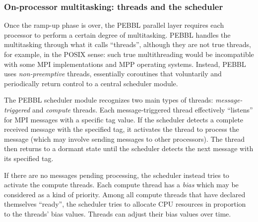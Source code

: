 \subsubsection{On-processor multitasking: threads and the scheduler}

Once the ramp-up phase is over, the PEBBL parallel layer requires each
processor to perform a certain degree of multitasking.  PEBBL handles
the multitasking through what it calls ``threads'', although they are
not true threads, for example, in the POSIX sense: such true
multithreading would be incompatible with some MPI implementations and
MPP operating systems.  Instead, PEBBL uses \emph{non-preemptive}
threads, essentially coroutines that voluntarily and periodically
return control to a central scheduler module.

The PEBBL scheduler module recognizes two main types of threads:
\emph{message-triggered} and \emph{compute} threads.  Each
message-triggered thread effectively ``listens'' for MPI messages with
a specific tag value.  If the scheduler detects a complete received
message with the specified tag, it activates the thread to process the
message (which may involve sending messages to other processors).  The
thread then returns to a dormant state until the scheduler detects the
next message with its specified tag.

If there are no messages pending processing, the scheduler instead
tries to activate the compute threads.  Each compute thread has a
\emph{bias} which may be considered as a kind of priority.  Among all
compute threads that have declared themselves ``ready'', the scheduler
tries to allocate CPU resources in proportion to the threads'
bias values.  Threads can adjust their bias values over time.  

